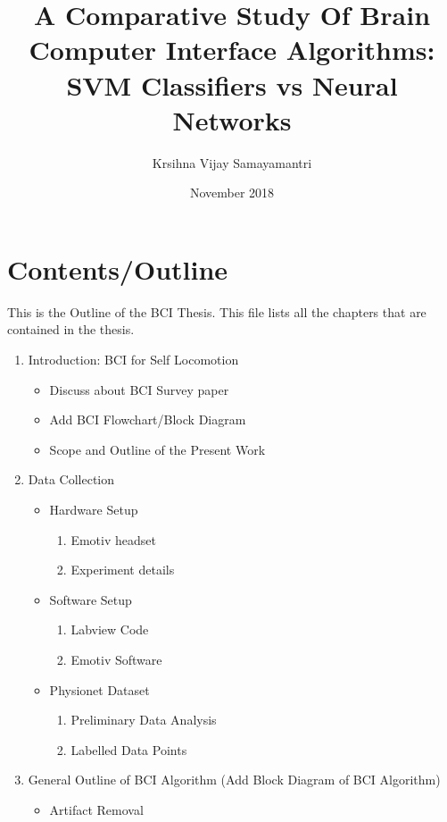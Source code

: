\documentclass{article}
\title{A Comparative Study Of Brain Computer Interface Algorithms: SVM Classifiers vs Neural Networks}
\author{Krsihna Vijay Samayamantri}
\date{November 2018}
\begin{document}
\maketitle

\section{Contents/Outline}
This is the Outline of the BCI Thesis. This file lists all the chapters that are contained in the thesis.
\begin{enumerate}
    \item Introduction: BCI for Self Locomotion
    \begin{itemize}
        \item Discuss about BCI Survey paper
        \item Add BCI Flowchart/Block Diagram
        \item Scope and Outline of the Present Work
    \end{itemize}
    \item Data Collection
    \begin{itemize}
        \item Hardware Setup 
        \begin{enumerate}
            \item Emotiv headset 
            \item Experiment details
        \end{enumerate}
        \item Software Setup 
        \begin{enumerate}
            \item Labview Code 
            \item Emotiv Software
        \end{enumerate}
        \item Physionet Dataset
        \begin{enumerate}
            \item Preliminary Data Analysis
            \item Labelled Data Points
        \end{enumerate}
    \end{itemize}
    \item General Outline of BCI Algorithm
    \newline (Add Block Diagram of BCI Algorithm)
    \begin{itemize}
        \item Artifact Removal
        \begin{enumerate}

\end{enumerate}
\end{itemize}
\end{enumerate}
\end{document}
